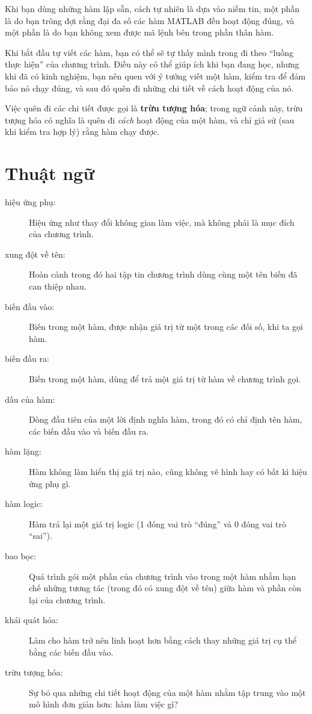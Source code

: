\documentclass[12pt]{book}
\begin{document}
Khi bạn dùng những hàm lập sẵn, cách tự nhiên là dựa vào niềm tin,
một phần là do bạn trông đợi rằng đại đa số các hàm MATLAB đều hoạt
động đúng, và một phần là do bạn không xem được mã lệnh bên trong
phần thân hàm.

Khi bắt đầu tự viết các hàm, bạn có thể sẽ tự thấy mình trong 
đi theo ``luồng thực hiện'' của chương trình. Điều này có thể 
giúp ích khi bạn đang học, nhưng khi đã có kinh nghiệm, bạn nên
quen với ý tưởng viết một hàm, kiểm tra để đảm bảo nó chạy đúng,
và sau đó quên đi những chi tiết về cách hoạt động của nó.

Việc quên đi các chi tiết được gọi là {\bf trừu tượng hóa};
trong ngữ cảnh này, trừu tượng hóa có nghĩa là quên đi {\em cách} 
hoạt động của một hàm, và chỉ giả sử (sau khi kiểm tra hợp lý)
rằng hàm chạy được.


\section{Thuật ngữ}

\begin{description}

\item[hiệu ứng phụ:] Hiệu ứng như thay đổi không gian làm việc,
mà không phải là mục đích của chương trình.

\item[xung đột về tên:] Hoàn cảnh trong đó hai tập tin chương trình
dùng cùng một tên biến đã can thiệp nhau.

\item[biến đầu vào:] Biến trong một hàm, được nhận giá trị 
từ một trong các đối số, khi ta gọi hàm.

\item[biến đầu ra:] Biến trong một hàm, dùng để trả một giá trị
từ hàm về chương trình gọi.

\item[dấu của hàm:] Dòng đầu tiên của một lời định nghĩa hàm,
trong đó có chỉ định tên hàm, các biến đầu vào và biến đầu ra.

\item[hàm lặng:] Hàm không làm hiển thị giá trị nào, cũng không
vẽ hình hay có bất kì hiệu ứng phụ gì.

\item[hàm logic:] Hàm trả lại một giá trị logic (1 đóng vai trò ``đúng''
và 0 đóng vai trò ``sai'').

\item[bao bọc:] Quá trình gói một phần của chương trình vào trong
một hàm nhằm hạn chế những tương tác (trong đó có xung đột về tên)
giữa hàm và phần còn lại của chương trình.

\item[khái quát hóa:] Làm cho hàm trở nên linh hoạt hơn bằng cách
thay những giá trị cụ thể bằng các biến đầu vào.

\item[trừu tượng hóa:] Sự bỏ qua những chi tiết hoạt động của một hàm
nhằm tập trung vào một mô hình đơn giản hơn: hàm làm việc gì?


\end{description}
\end{document}
